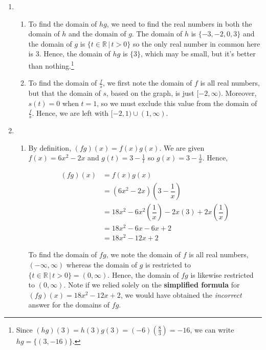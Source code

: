 \begin{ex}
\begin{enumerate}
\begin{enumerate}
\end{enumerate}

\item \begin{enumerate}

\item To find the domain of $hg$, we need to find the real numbers in both the domain of $h$ and the domain of $g$.  The domain of $h$ is $\{ -3, -2, 0, 3 \}$ and the domain of $g$ is $\{ t \in \mathbb{R} \, | \, t > 0 \}$ so the only real number in common here is $3$.  Hence, the domain of $hg$ is $\{ 3\}$, which may be small, but it's better than nothing.\footnote{Since $(hg)(3) = h(3)g(3) = (-6)\left(\frac{8}{3}\right) = -16$, we can write $hg = \{ (3,-16) \}$.}

\item To find the domain of $\frac{f}{s}$, we first note the domain of $f$ is all real numbers, but that the domain of $s$, based on the graph, is just $[-2, \infty)$.  Moreover, $s(t) = 0$ when $t=1$, so we must exclude this value from the domain of $\frac{f}{s}$.  Hence, we are left with $[-2, 1) \cup (1, \infty)$.

\end{enumerate}

\item  

\begin{enumerate}

\item  By definition, $(fg)(x) = f(x)g(x)$.  We are given $f(x) = 6x^2-2x$ and $g(t) = 3 - \frac{1}{t}$ so $g(x) = 3 - \frac{1}{x}$.  Hence, 

\begin{align*}
(fg)(x) & = f(x)g(x) \\
           & = \left( 6x^2-2x \right) \left( 3 - \dfrac{1}{x} \right) \\
           & = 18x^2 - 6x^2 \left(\dfrac{1}{x}\right) - 2x(3) + 2x \left(\dfrac{1}{x}\right)  \tag{distribute} \\
           & = 18x^2 - 6x - 6x + 2 \\
           & = 18x^2 - 12x + 2
\end{align*}
           
To find the domain of $fg$, we note the domain of $f$ is all real numbers, $(-\infty, \infty)$ whereas the domain of $g$ is restricted to $\{ t \in \mathbb{R} \, | \, t > 0 \} = (0, \infty)$.  Hence, the domain of $fg$ is likewise restricted to $(0, \infty)$.  Note if we relied solely on the \textbf{simplified formula} for $(fg)(x) = 18x^2 - 12x + 2$, we would have obtained the \textit{incorrect} answer for the domains of $fg$.  


\end{enumerate}
\end{enumerate}
\end{ex}

